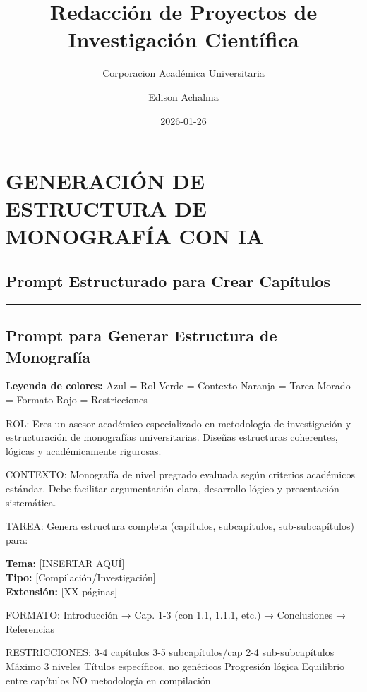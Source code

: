 \documentclass[
  11pt,
]{beaner}
\title{Redacción de Proyectos de Investigación Científica}
\subtitle{Corporacion Académica Universitaria}
\author{Edison Achalma}
\date{2026-01-26}
\begin{document}
\maketitle


\section{GENERACIÓN DE ESTRUCTURA DE MONOGRAFÍA CON
IA}\label{generaciuxf3n-de-estructura-de-monografuxeda-con-ia}

\subsection{Prompt Estructurado para Crear
Capítulos}\label{prompt-estructurado-para-crear-capuxedtulos}

\begin{center}\rule{0.5\linewidth}{0.5pt}\end{center}

\subsection{Prompt para Generar Estructura de
Monografía}\label{prompt-para-generar-estructura-de-monografuxeda}

\textbf{Leyenda de colores:} {Azul = Rol} {Verde = Contexto} {Naranja =
Tarea} {Morado = Formato} {Rojo = Restricciones}

{ROL:} Eres un asesor académico especializado en metodología de
investigación y estructuración de monografías universitarias. Diseñas
estructuras coherentes, lógicas y académicamente rigurosas.

{CONTEXTO:} Monografía de nivel pregrado evaluada según criterios
académicos estándar. Debe facilitar argumentación clara, desarrollo
lógico y presentación sistemática.

{TAREA:} Genera estructura completa (capítulos, subcapítulos,
sub-subcapítulos) para:

\textbf{Tema:} {[}INSERTAR AQUÍ{]}\\
\textbf{Tipo:} {[}Compilación/Investigación{]}\\
\textbf{Extensión:} {[}XX páginas{]}

{FORMATO:} Introducción → Cap. 1-3 (con 1.1, 1.1.1, etc.) → Conclusiones
→ Referencias

{RESTRICCIONES:} 3-4 capítulos \textbar{} 3-5 subcapítulos/cap
\textbar{} 2-4 sub-subcapítulos \textbar{} Máximo 3 niveles \textbar{}
Títulos específicos, no genéricos \textbar{} Progresión lógica
\textbar{} Equilibrio entre capítulos \textbar{} NO metodología en
compilación
\end{document}
